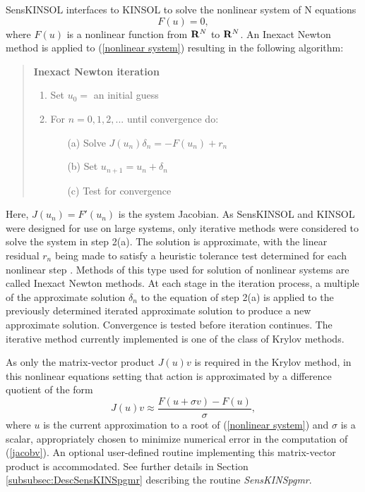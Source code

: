 \documentclass[11pt]{article}
\begin{document}
SensKINSOL interfaces to KINSOL \cite{KINSOLusrguide} to solve the
nonlinear system of N equations
\begin{equation}
F(u) = 0, \label{nonlinear system}
\end{equation}
where $F(u)$ is a nonlinear function from ${\bf R}^N$ to ${\bf R}^N$.
An Inexact Newton method is applied to (\ref{nonlinear system})
resulting in the following algorithm:
\begin{quote}
{\bf Inexact Newton iteration}
\begin{enumerate}
   \item Set $u_0 = $ an initial guess
   \item For $n = 0, 1, 2,...$ until convergence do:\nonumber
      \begin{itemize}
          \item[(a)] Solve $J(u_n)\delta_n = - F(u_n) + r_n$
          \item[(b)] Set $u_{n+1} = u_n + \delta_n$
          \item[(c)] Test for convergence
      \end{itemize}
\end{enumerate}
\end{quote}
Here, $J(u_n) = F'(u_n)$ is the system Jacobian. As SensKINSOL and
KINSOL were designed for use on large systems, only iterative methods
were considered to solve the system in step 2(a). The solution is
approximate, with the linear residual $r_n$ being made to satisfy a
heuristic tolerance test determined for each nonlinear step
\cite{EiWa96}. Methods of this type used for solution of nonlinear
systems are called Inexact Newton methods. At each stage in the
iteration process, a multiple of the approximate solution $\delta_n$ to
the equation of step 2(a) is applied to the previously determined
iterated approximate solution to produce a new approximate solution.
Convergence is tested before iteration continues. The iterative method
currently implemented is one of the class of Krylov methods.

As only the matrix-vector product $J(u)v$ is required in the Krylov
method, in this nonlinear equations setting that action is approximated
by a difference quotient of the form
\begin{equation}
    J(u)v  \approx \frac {F(u+\sigma v) - F(u)}{\sigma},  \label{jacobv}
\end{equation}
where $u$ is the current approximation to a root of (\ref{nonlinear
system}) and $\sigma$ is a scalar, appropriately chosen to minimize
numerical error in the computation of (\ref{jacobv}). An optional
user-defined routine implementing this matrix-vector product is
accommodated. See further details in Section
\ref{subsubsec:DescSensKINSpgmr} describing the routine {\em
SensKINSpgmr}.
\end{document}
